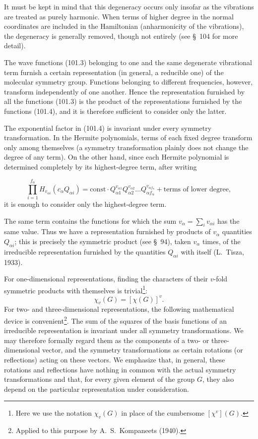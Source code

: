 It must be kept in mind that this degeneracy occurs only insofar as the vibrations are treated as purely harmonic. When terms of higher degree in the normal coordinates are included in the Hamiltonian (anharmonicity of the vibrations), the degeneracy is generally removed, though not entirely (see \S~104 for more detail).

The wave functions (101.3) belonging to one and the same degenerate vibrational term furnish a certain representation (in general, a reducible one) of the molecular symmetry group. Functions belonging to different frequencies, however, transform independently of one another. Hence the representation furnished by all the functions (101.3) is the product of the representations furnished by the functions (101.4), and it is therefore sufficient to consider only the latter.

The exponential factor in (101.4) is invariant under every symmetry transformation. In the Hermite polynomials, terms of each fixed degree transform only among themselves (a symmetry transformation plainly does not change the degree of any term). On the other hand, since each Hermite polynomial is determined completely by its highest-degree term, after writing

\[
 \prod_{i=1}^{f_\alpha}H_{v_{\alpha i}}(c_\alpha Q_{\alpha i})
 =\mathrm{const}\cdot Q_{\alpha1}^{v_{\alpha1}}Q_{\alpha2}^{v_{\alpha2}}\ldots
 Q_{\alpha f_\alpha}^{v_{\alpha f_\alpha}}+\text{terms of lower degree},
\]
it is enough to consider only the highest-degree term.

The same term contains the functions for which the sum $v_\alpha=\sum_i v_{\alpha i}$ has the same value. Thus we have a representation furnished by products of $v_\alpha$ quantities $Q_{\alpha i}$; this is precisely the symmetric product (see \S~94), taken $v_\alpha$ times, of the irreducible representation furnished by the quantities $Q_{\alpha i}$ with itself (L.~Tisza, 1933).

For one-dimensional representations, finding the characters of their $v$-fold symmetric products with themselves is trivial\footnote{Here we use the notation $\chi_v(G)$ in place of the cumbersome $[\chi^v](G)$.}:
\[
 \chi_v(G)=[\chi(G)]^v.
\]
For two- and three-dimensional representations, the following mathematical device is convenient\footnote{Applied to this purpose by A.~S.~Kompaneets (1940).}. The sum of the squares of the basis functions of an irreducible representation is invariant under all symmetry transformations. We may therefore formally regard them as the components of a two- or three-dimensional vector, and the symmetry transformations as certain rotations (or reflections) acting on these vectors. We emphasize that, in general, these rotations and reflections have nothing in common with the actual symmetry transformations and that, for every given element of the group $G$, they also depend on the particular representation under consideration.

